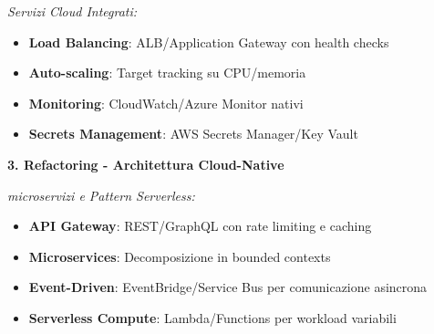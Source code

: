 \textit{Servizi Cloud Integrati:}
\begin{itemize}
    \item \textbf{Load Balancing}: ALB/Application Gateway con health checks
    \item \textbf{Auto-scaling}: Target tracking su CPU/memoria
    \item \textbf{Monitoring}: CloudWatch/Azure Monitor nativi
    \item \textbf{Secrets Management}: AWS Secrets Manager/Key Vault
\end{itemize}

\textbf{3. Refactoring - Architettura Cloud-Native}

\textit{\gls{microservizi} e Pattern Serverless:}
\begin{itemize}
    \item \textbf{API Gateway}: REST/GraphQL con rate limiting e caching
    \item \textbf{Microservices}: Decomposizione in bounded contexts
    \item \textbf{Event-Driven}: EventBridge/Service Bus per comunicazione asincrona
    \item \textbf{Serverless Compute}: Lambda/Functions per workload variabili
\end{itemize}

